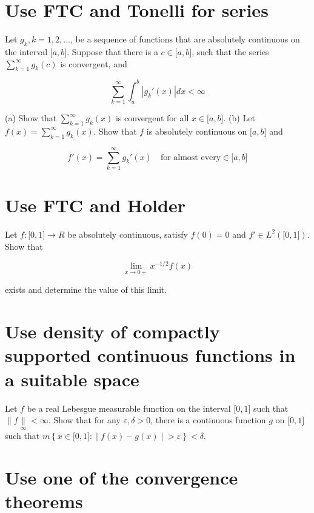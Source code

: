 \chapter{Use FTC and Tonelli for series}\label{use-ftc-and-tonelli-for-series}

Let \(g_{k},k = 1,2,\ldots\), be a sequence of functions that are absolutely continuous on the interval \(\lbrack a,b\rbrack\). Suppose that there is a \(c \in \lbrack a,b\rbrack\), such that the series \(\sum_{k = 1}^{\infty}g_{k}(c)\) is convergent, and

\[\sum\limits_{k = 1}^{\infty}\int_{a}^{b}\left| {g_{k}'(x)} \right|dx < \infty\]

(a) Show that \(\sum_{k = 1}^{\infty}g_{k}(x)\) is convergent for all \(x \in \lbrack a,b\rbrack\). (b) Let \(f(x) = \sum_{k = 1}^{\infty}g_{k}(x)\). Show that \(f\) is absolutely continuous on \(\lbrack a,b\rbrack\) and

\[f'(x) = \sum\limits_{k = 1}^{\infty}g_{k}'(x)\quad\text{for almost every} \in \lbrack a,b\rbrack\]



\chapter{Use FTC and Holder}\label{use-ftc-and-holder}

Let \(f:\lbrack 0,1\rbrack\rightarrow R\) be absolutely continuous, satisfy \(f(0) = 0\) and \(f' \in L^{2}(\lbrack 0,1\rbrack)\). Show that

\[\lim\limits_{x\rightarrow 0 +}x^{- 1/2}f(x)\]

exists and determine the value of this limit.

\chapter{Use density of compactly supported continuous functions in a suitable space}\label{use-density-of-compactly-supported-continuous-functions-in-a-suitable-space}

Let \(f\) be a real Lebesgue measurable function on the interval \(\lbrack 0,1\rbrack\) such that \(\parallel f\underset{\infty}{\parallel} < \infty\). Show that for any \(\varepsilon,\delta > 0\), there is a continuous function \(g\) on \(\lbrack 0,1\rbrack\) such that \(m\left\{ x \in \lbrack 0,1\rbrack: \middle| f(x) - g(x) \middle| > \varepsilon \right\} < \delta\).

\chapter{Use one of the convergence theorems}\label{use-one-of-the-convergence-theorems}

